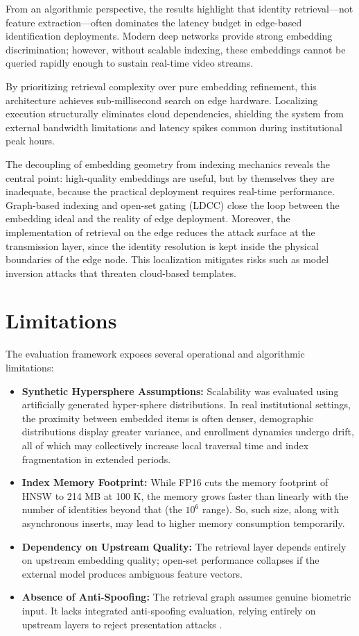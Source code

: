 \documentclass[conference]{IEEEtran}
\begin{document}
From an algorithmic perspective, the results highlight that identity retrieval—not feature extraction—often dominates the latency budget in edge-based identification deployments. Modern deep networks provide strong embedding discrimination; however, without scalable indexing, these embeddings cannot be queried rapidly enough to sustain real-time video streams.

By prioritizing retrieval complexity over pure embedding refinement, this architecture achieves sub-millisecond search on edge hardware. Localizing execution structurally eliminates cloud dependencies, shielding the system from external bandwidth limitations and latency spikes common during institutional peak hours.

The decoupling of embedding geometry from indexing mechanics reveals the central point: high-quality embeddings are useful, but by themselves they are inadequate, because the practical deployment requires real-time performance. Graph-based indexing and open-set gating (LDCC) close the loop between the embedding ideal and the reality of edge deployment. Moreover, the implementation of retrieval on the edge reduces the attack surface at the transmission layer, since the identity resolution is kept inside the physical boundaries of the edge node. This localization mitigates risks such as model inversion attacks \cite{b20} that threaten cloud-based templates.

\section{Limitations}

The evaluation framework exposes several operational and algorithmic limitations:
\begin{itemize}
    \item \textbf{Synthetic Hypersphere Assumptions:} Scalability was evaluated using artificially generated hyper-sphere distributions. In real institutional settings, the proximity between embedded items is often denser, demographic distributions display greater variance, and enrollment dynamics undergo drift, all of which may collectively increase local traversal time and index fragmentation in extended periods.
    \item \textbf{Index Memory Footprint:} While FP16 cuts the memory footprint of HNSW to 214 MB at 100 K, the memory grows faster than linearly with the number of identities beyond that (the $10^6$ range). So, such size, along with asynchronous inserts, may lead to higher memory consumption temporarily.
    \item \textbf{Dependency on Upstream Quality:} The retrieval layer depends entirely on upstream embedding quality; open-set performance collapses if the external model produces ambiguous feature vectors.
    \item \textbf{Absence of Anti-Spoofing:} The retrieval graph assumes genuine biometric input. It lacks integrated anti-spoofing evaluation, relying entirely on upstream layers to reject presentation attacks \cite{b21}.
\end{itemize}
\end{document}
